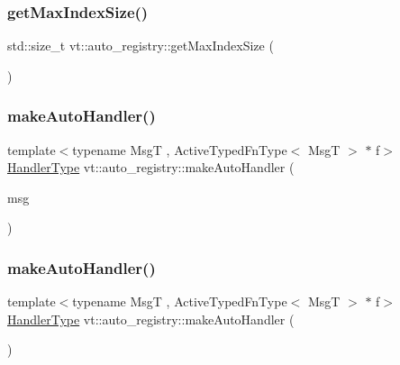 \mbox{\label{namespacevt_1_1auto__registry_a590741e9077c758629426d70ea37f4bf}} 
\subsubsection{\texorpdfstring{get\+Max\+Index\+Size()}{getMaxIndexSize()}}
{\footnotesize\ttfamily std\+::size\+\_\+t vt\+::auto\+\_\+registry\+::get\+Max\+Index\+Size (\begin{DoxyParamCaption}{ }\end{DoxyParamCaption})\hspace{0.3cm}{\ttfamily [inline]}}

\mbox{\label{namespacevt_1_1auto__registry_abac49a5da9edd265913ca474a6624a09}} 
\subsubsection{\texorpdfstring{make\+Auto\+Handler()}{makeAutoHandler()}\hspace{0.1cm}{\footnotesize\ttfamily [1/2]}}
{\footnotesize\ttfamily template$<$typename MsgT , Active\+Typed\+Fn\+Type$<$ Msg\+T $>$ $\ast$ f$>$ \\
\hyperlink{namespacevt_af64846b57dfcaf104da3ef6967917573}{Handler\+Type} vt\+::auto\+\_\+registry\+::make\+Auto\+Handler (\begin{DoxyParamCaption}\item[{MsgT $\ast$const}]{msg }\end{DoxyParamCaption})}

\mbox{\label{namespacevt_1_1auto__registry_a965b4801e4d0aee0e5b86342c92baf68}} 
\subsubsection{\texorpdfstring{make\+Auto\+Handler()}{makeAutoHandler()}\hspace{0.1cm}{\footnotesize\ttfamily [2/2]}}
{\footnotesize\ttfamily template$<$typename MsgT , Active\+Typed\+Fn\+Type$<$ Msg\+T $>$ $\ast$ f$>$ \\
\hyperlink{namespacevt_af64846b57dfcaf104da3ef6967917573}{Handler\+Type} vt\+::auto\+\_\+registry\+::make\+Auto\+Handler (\begin{DoxyParamCaption}{ }\end{DoxyParamCaption})\hspace{0.3cm}{\ttfamily [inline]}}

